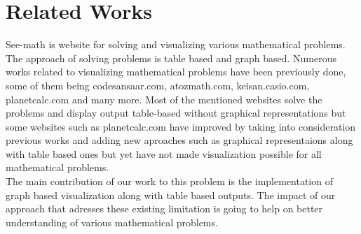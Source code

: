 
\chapter{Related Works}
\noindent

See-math is website for solving and visualizing various mathematical problems. The approach of solving problems is table based and graph based. Numerous works related to visualizing mathematical problems have been previously done, some of them being codesansaar.com, atozmath.com, keisan.casio.com, planetcalc.com and many more. Most of the mentioned websites solve the problems and display output table-based without graphical representations but some websites such as planetcalc.com have improved by taking into consideration previous works and adding new aproaches such as graphical representaions along with table based ones but yet have not made visualization possible for all mathematical problems. \\

\noindent
The main contribution of our work to this problem is the implementation of graph based visualization along with table based outputs. The impact of our approach that adresses these existing limitation is going to help on better understanding of various mathematical problems.

